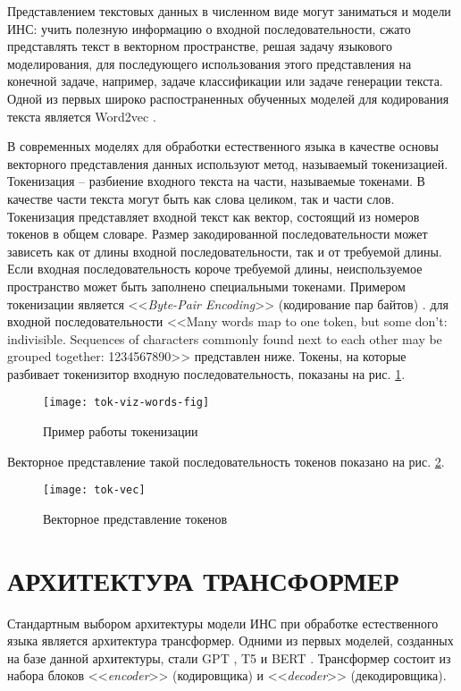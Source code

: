 Представлением текстовых данных в численном виде могут заниматься и модели ИНС: учить полезную информацию о входной последовательности, сжато представлять текст в векторном пространстве, решая задачу языкового моделирования, для последующего использования этого представления на конечной задаче, например, задаче классификации или задаче генерации текста. Одной из первых широко распостраненных обученных моделей для кодирования текста является Word2vec \cite{word2vec-paper}.

В современных моделях для обработки естественного языка в качестве основы векторного представления данных используют метод, называемый токенизацией. Токенизация -- разбиение входного текста на части, называемые токенами. В качестве части текста могут быть как слова целиком, так и части слов. Токенизация представляет входной текст как вектор, состоящий из номеров токенов в общем словаре. Размер закодированной последовательности может зависеть как от длины входной последовательности, так и от требуемой длины. Если входная последовательность короче требуемой длины, неиспользуемое пространство может быть заполнено специальными токенами. Примером токенизации является <<\textit{Byte-Pair Encoding}>> (кодирование пар байтов) \cite{bpe-paper}. для входной последовательности <<Many words map to one token, but some don't: indivisible. Sequences of characters commonly found next to each other may be grouped together: 1234567890>> представлен ниже. Токены, на которые разбивает токенизитор входную последовательность, показаны на рис. \ref{fig:tok-viz-words-fig}.
\begin{figure}[H]
    \centering
    \texttt{[image: tok-viz-words-fig]}
    \caption{Пример работы токенизации}
    \label{fig:tok-viz-words-fig}
\end{figure}

Векторное представление такой последовательность токенов показано на рис. \ref{fig:tok-vec}.
\begin{figure}[H]
    \centering
    \texttt{[image: tok-vec]}
    \caption{Векторное представление токенов}
    \label{fig:tok-vec}
\end{figure}

\section{АРХИТЕКТУРА ТРАНСФОРМЕР}
Стандартным выбором архитектуры модели ИНС при обработке естественного языка является архитектура трансформер. Одними из первых моделей, созданных на базе данной архитектуры, стали GPT \cite{gpt-paper}, T5 \cite{t5-paper} и BERT \cite{bert-paper}. Трансформер состоит из набора блоков <<\textit{encoder}>> (кодировщика) и <<\textit{decoder}>> (декодировщика).

